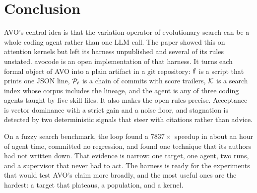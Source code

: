 \section{Conclusion}
\label{sec:conclusion}

AVO's central idea is that the variation operator of evolutionary search can be a whole coding
agent rather than one LLM call. The paper showed this on attention kernels but left its harness
unpublished and several of its rules unstated. avocode is an open implementation of that harness. It
turns each formal object of AVO into a plain artifact in a git repository: $\mathbf{f}$ is a script that
prints one JSON line, $\mathcal{P}_t$ is a chain of commits with score trailers, $\mathcal{K}$ is a search index whose
corpus includes the lineage, and the agent is any of three coding agents taught by five skill files.
It also makes the open rules precise. Acceptance is vector dominance with a strict gain and a noise
floor, and stagnation is detected by two deterministic signals that steer with citations rather
than advice.

On a fuzzy search benchmark, the loop found a $7837\times$ speedup in about an hour of agent time,
committed no regression, and found one technique that its authors had not written down. That
evidence is narrow: one target, one agent, two runs, and a supervisor that never had to act. The
harness is ready for the experiments that would test AVO's claim more broadly, and the most useful
ones are the hardest: a target that plateaus, a population, and a kernel.
